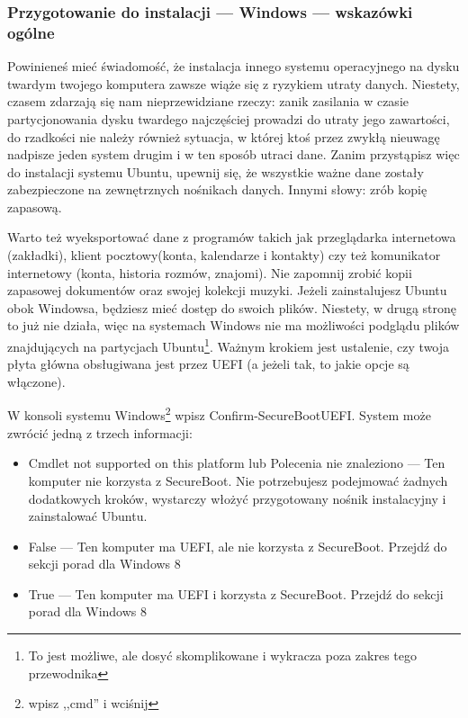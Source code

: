 \subsubsection{Przygotowanie do instalacji --- Windows --- wskazówki ogólne}
\label{sec:przygotowanie_windows}
Powinieneś mieć świadomość, że instalacja innego systemu operacyjnego na dysku twardym twojego komputera zawsze wiąże się z ryzykiem utraty danych. Niestety, czasem zdarzają się nam nieprzewidziane rzeczy: zanik zasilania w czasie partycjonowania dysku twardego najczęściej prowadzi do utraty jego zawartości, do rzadkości nie należy również sytuacja, w której ktoś przez zwykłą nieuwagę  nadpisze jeden system drugim i w ten sposób utraci dane. Zanim przystąpisz więc do instalacji systemu Ubuntu, upewnij się, że wszystkie ważne dane zostały zabezpieczone na zewnętrznych nośnikach danych. Innymi słowy: zrób kopię zapasową.

Warto też wyeksportować dane z programów takich jak przeglądarka internetowa (zakładki), klient pocztowy(konta, kalendarze i kontakty) czy też komunikator internetowy (konta, historia rozmów, znajomi). Nie zapomnij zrobić kopii zapasowej dokumentów oraz swojej kolekcji muzyki. Jeżeli zainstalujesz Ubuntu obok Windowsa, będziesz mieć dostęp do swoich plików. Niestety, w drugą stronę to już nie działa, więc na systemach Windows nie ma możliwości podglądu plików znajdujących na partycjach Ubuntu\footnote{To jest możliwe, ale dosyć skomplikowane i wykracza poza zakres tego przewodnika}.
Ważnym krokiem jest ustalenie, czy twoja płyta główna obsługiwana jest przez UEFI (a jeżeli tak, to jakie opcje są włączone).

W konsoli systemu Windows\footnote{ wpisz ,,cmd'' i wciśnij \keys{\returnwin} } wpisz \textcolor{ubuntu_orange}{Confirm-SecureBootUEFI}. System może zwrócić jedną z trzech informacji:
\begin{itemize}
\item \textcolor{ubuntu_orange}{Cmdlet not supported on this platform} lub \textcolor{ubuntu_orange}{Polecenia nie znaleziono} --- Ten komputer nie korzysta z SecureBoot. Nie potrzebujesz podejmować żadnych dodatkowych kroków, wystarczy włożyć przygotowany nośnik instalacyjny i zainstalować Ubuntu.
\item \textcolor{ubuntu_orange}{False} --- Ten komputer ma UEFI, ale nie korzysta z SecureBoot. Przejdź do sekcji porad dla Windows 8
\item \textcolor{ubuntu_orange}{True} --- Ten komputer ma UEFI i korzysta z SecureBoot. Przejdź do sekcji porad dla Windows 8
\end{itemize}
